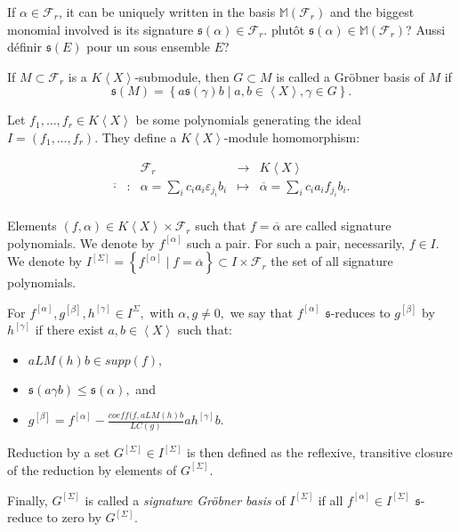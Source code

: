\documentclass[sigconf]{acmart}
\theoremstyle{plain}
\theoremstyle{definition}
\theoremstyle{remark}
\newcommand{\MM}{\mathbb M}
\newcommand{\LC}{LC}
\newcommand{\LM}{LM}
\newcommand\fixmecc[1]{{\color{red}{\underline{\bf C:}} #1}}
\newcommand{\KX}{K \left\langle X \right\rangle}
\begin{document}
If $\alpha \in \mathscr{F}_r$, it can be uniquely
written in the basis 
$\MM \left( \mathscr{F}_r \right) $
and the biggest monomial
involved is its signature
$\mathfrak{s}(\alpha) \in
\mathscr{F}_r$.
\fixmecc{plutôt $\mathfrak{s}(\alpha) \in \MM (\mathscr{F}_r)$? Aussi définir
$\mathfrak{s}(E)$ pour un sous ensemble $E$?}

If $M \subset \mathscr{F}_r$
is a $\KX$-submodule,
then $G \subset M$ is called
a Gröbner basis of $M$ if
\[\mathfrak{s}(M)= \left\lbrace a \mathfrak{s}(\gamma) b \mid a,b \in \left\langle X \right\rangle, \gamma \in G \right\rbrace. \]

Let $f_1,\dots,f_r \in \KX$
be some polynomials
generating the ideal $I=(f_1,\dots,f_r).$
They define a 
$\KX$-module homomorphism:

\[
\begin{array}{ccccc}
&& \mathscr{F}_r & \rightarrow & \KX \\
\overline{\cdot}& : &\alpha = \sum_i c_i a_i \varepsilon_{j_i} b_i&\mapsto& \overline{\alpha}=\sum_i c_i a_i f_{j_i} b_i. \\
\end{array}\]

Elements $(f,\alpha) \in \KX \times \mathscr{F}_r$
such that $f=\overline{\alpha}$
are called signature polynomials.
We denote by $f^{[\alpha]}$
such a pair. 
For such a pair, necessarily,
$f \in I.$
We denote by $I^{[\Sigma ]}=\left\lbrace f^{[\alpha]} \mid f=\overline{\alpha} \right\rbrace \subset I \times \mathscr{F}_r$
the set of all signature
polynomials.

For $f^{[\alpha]},g^{[\beta]},
h^{[\gamma]} \in I^{\Sigma},$
with $\alpha, g \neq 0,$
we say that 
$f^{[\alpha]}$ $\mathfrak{s}$-reduces to
$g^{[\beta]}$ by
$h^{[\gamma]}$
if there exist $a,b \in 
\left\langle X \right\rangle$
such that:
\begin{itemize}
\item $a \LM(h)b \in supp(f),$
\item $\mathfrak{s}(a \gamma b) \leq \mathfrak{s}(\alpha),$ and
\item $g^{[\beta]}=f^{[\alpha]}-\frac{coeff(f,a \LM(h)b}{\LC(g)} a h^{[\gamma]}b.$
\end{itemize}
Reduction by a set $G^{[\Sigma]} \in I^{[\Sigma]}$
is then defined as the 
reflexive, transitive closure
of the reduction by elements
of $G^{[\Sigma]} $.

Finally, $G^{[\Sigma]} $
is called a \textit{signature
Gröbner basis} of $I^{[\Sigma]}$ if all
$f^{[\alpha]} \in I^{[\Sigma]}$ $\mathfrak{s}$-reduce to zero by $G^{[\Sigma]}.$
\end{document}
